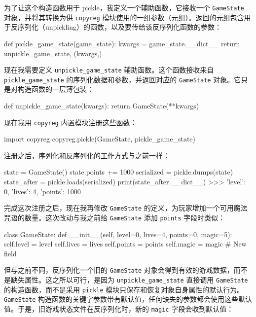 为了让这个构造函数用于 pickle，我定义一个辅助函数，它接收一个 \texttt{GameState} 对象，并将其转换为供 \texttt{copyreg} 模块使用的一组参数（元组）。返回的元组包含用于反序列化（unpickling）的函数，以及要传给该反序列化函数的参数：

\begin{codebox}[python]
def pickle_game_state(game_state):
    kwargs = game_state.__dict__
    return unpickle_game_state, (kwargs,)
\end{codebox}

现在我需要定义 \texttt{unpickle\_game\_state} 辅助函数。这个函数接收来自 \texttt{pickle\_game\_state} 的序列化数据和参数，并返回对应的 \texttt{GameState} 对象。它只是对构造函数的一层薄包装：

\begin{codebox}[python]
def unpickle_game_state(kwargs):
    return GameState(**kwargs)
\end{codebox}

现在我用 \texttt{copyreg} 内置模块注册这些函数：

\begin{codebox}[python]
import copyreg
copyreg.pickle(GameState, pickle_game_state)
\end{codebox}

注册之后，序列化和反序列化的工作方式与之前一样：

\begin{codebox}[python]
state = GameState()
state.points += 1000
serialized = pickle.dumps(state)
state_after = pickle.loads(serialized)
print(state_after.__dict__)
>>>
{'level': 0, 'lives': 4, 'points': 1000}
\end{codebox}

完成这次注册之后，现在我再修改 \texttt{GameState} 的定义，为玩家增加一个可用魔法咒语的数量。这次改动与我之前给 \texttt{GameState} 添加 \texttt{points} 字段时类似：

\begin{codebox}[python]
class GameState:
    def __init__(self, level=0, lives=4, points=0, magic=5):
        self.level = level
        self.lives = lives
        self.points = points
        self.magic = magic  # New field
\end{codebox}

但与之前不同，反序列化一个旧的 \texttt{GameState} 对象会得到有效的游戏数据，而不是缺失属性。这之所以可行，是因为 \texttt{unpickle\_game\_state} 直接调用 \texttt{GameState} 的构造函数，而不是采用 \texttt{pickle} 模块只保存和恢复对象自身属性的默认行为。\texttt{GameState} 构造函数的关键字参数带有默认值，任何缺失的参数都会使用这些默认值。于是，旧游戏状态文件在反序列化时，新的 \texttt{magic} 字段会收到默认值：


